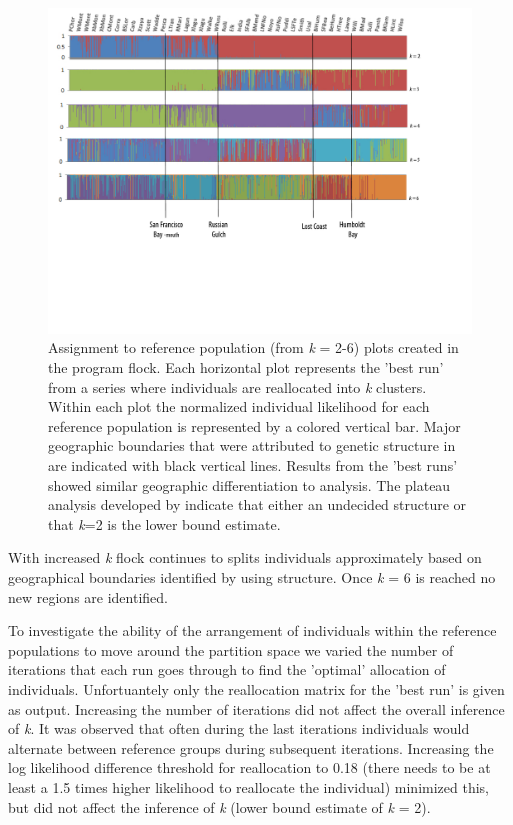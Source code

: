 \begin{figure}
\begin{center}
    \includegraphics[width=\textwidth]{images/Figures-Pat/FLOCK_OneSampDefault.pdf}
    \caption{Assignment to reference population (from \textit{k} = 2-6) plots created in the program {\sc flock}. Each horizontal plot represents the 'best run' from a series where individuals are reallocated into \textit{k} clusters. Within each plot the normalized individual likelihood for each reference population is represented by a colored vertical bar. Major geographic boundaries that were attributed to genetic structure in \citet{Garzaetal_norcal} are indicated with black vertical lines. Results from the 'best runs' showed similar geographic differentiation to \citet{Garzaetal_norcal} analysis. The plateau analysis developed by \citet{Duc&Tur2012} indicate that either an undecided structure or that \textit{k}=2 is the lower bound estimate.}
    \label{Fig.1}
\end{center}
\end{figure}

With increased \textit{k} {\sc flock} continues to splits individuals approximately based on geographical boundaries identified by \citet{Garzaetal_norcal} using {\sc structure}. Once \textit{k} = 6 is reached no new regions are identified.

To investigate the ability of the arrangement of individuals within the reference populations to move around the partition space we varied the number of iterations that each run goes through to find the 'optimal' allocation of individuals. Unfortuantely only the reallocation matrix for the 'best run' is given as output. Increasing the number of iterations did not affect the overall inference of \textit{k}. It was observed that often during the last iterations individuals would alternate between reference groups during subsequent iterations. Increasing the log likelihood difference threshold for reallocation to 0.18 (there needs to be at least a 1.5 times higher likelihood to reallocate the individual) minimized this, but did not affect the inference of \textit{k} (lower bound estimate of \textit{k} = 2). 



